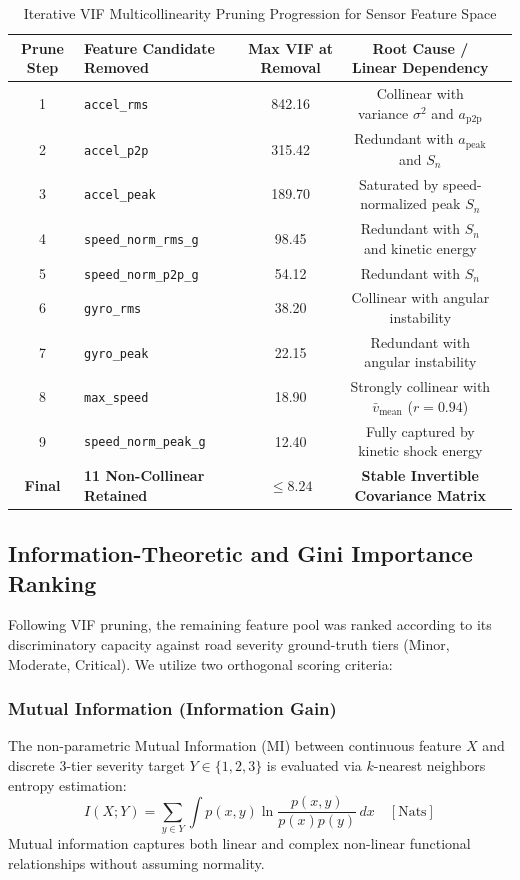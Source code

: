\begin{table}[h!]
\centering
\small
\caption{Iterative VIF Multicollinearity Pruning Progression for Sensor Feature Space}
\label{tab:vif_pruning}
\begin{tabular}{clccl}
\hline
\textbf{Prune Step} & \textbf{Feature Candidate Removed} & \textbf{Max VIF at Removal} & \textbf{Root Cause / Linear Dependency} \\ \hline
1 & \texttt{accel\_rms} & 842.16 & Collinear with variance $\sigma^2$ and $a_{\text{p2p}}$ \\
2 & \texttt{accel\_p2p} & 315.42 & Redundant with $a_{\text{peak}}$ and $S_n$ \\
3 & \texttt{accel\_peak} & 189.70 & Saturated by speed-normalized peak $S_n$ \\
4 & \texttt{speed\_norm\_rms\_g} & 98.45 & Redundant with $S_n$ and kinetic energy \\
5 & \texttt{speed\_norm\_p2p\_g} & 54.12 & Redundant with $S_n$ \\
6 & \texttt{gyro\_rms} & 38.20 & Collinear with angular instability \\
7 & \texttt{gyro\_peak} & 22.15 & Redundant with angular instability \\
8 & \texttt{max\_speed} & 18.90 & Strongly collinear with $\bar{v}_{\text{mean}}$ ($r = 0.94$) \\
9 & \texttt{speed\_norm\_peak\_g} & 12.40 & Fully captured by kinetic shock energy \\ \hline
\textbf{Final} & \textbf{11 Non-Collinear Retained} & $\mathbf{\le 8.24}$ & \textbf{Stable Invertible Covariance Matrix} \\ \hline
\end{tabular}
\end{table}

\subsection{Information-Theoretic and Gini Importance Ranking}
Following VIF pruning, the remaining feature pool was ranked according to its discriminatory capacity against road severity ground-truth tiers (Minor, Moderate, Critical). We utilize two orthogonal scoring criteria:

\subsubsection{Mutual Information (Information Gain)}
The non-parametric Mutual Information (MI) between continuous feature $X$ and discrete 3-tier severity target $Y \in \{1, 2, 3\}$ is evaluated via $k$-nearest neighbors entropy estimation:
\begin{equation}
    I(X; Y) = \sum_{y \in Y} \int p(x, y) \ln \frac{p(x, y)}{p(x) p(y)} \, dx \quad [\text{Nats}]
\end{equation}
Mutual information captures both linear and complex non-linear functional relationships without assuming normality.

